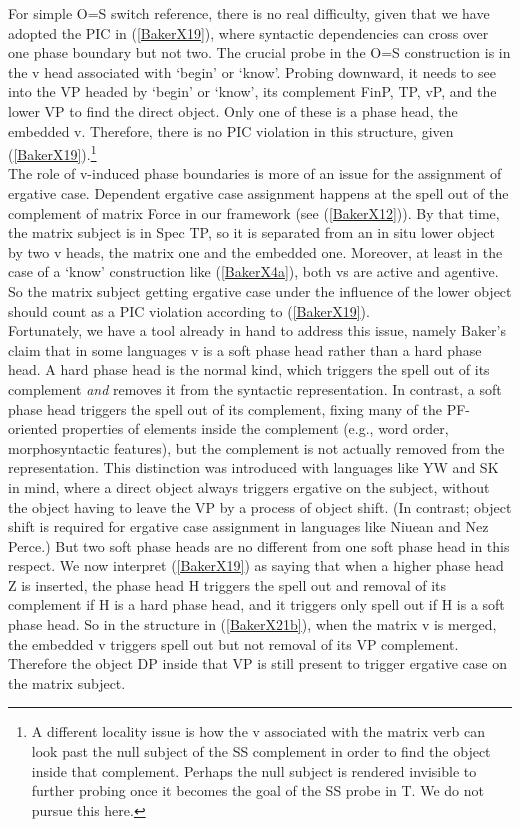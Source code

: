 \documentclass[output=paper,colorlinks,citecolor=brown,
]{langscibook}
\begin{document}
For simple O=S switch reference, there is no real difficulty, given that we have adopted the PIC in (\ref{BakerX19}), where syntactic dependencies can cross over one phase boundary but not two. The crucial probe in the O=S construction is in the v head associated with ‘begin’ or ‘know’. Probing downward, it needs to see into the VP headed by ‘begin’ or ‘know’, its complement FinP, TP, vP, and the lower VP to find the direct object. Only one of these is a phase head, the embedded v. Therefore, there is no PIC violation in this structure, given (\ref{BakerX19}).\footnote{A different locality issue is how the v associated with the matrix verb can look past the null subject of the SS complement in order to find the object inside that complement. Perhaps the null subject is rendered invisible to further probing once it becomes the goal of the SS probe in T. We do not pursue this here.}\\

The role of v-induced phase boundaries is more of an issue for the assignment of ergative case. Dependent ergative case assignment happens at the spell out of the complement of matrix Force in our framework (see (\ref{BakerX12})). By that time, the matrix subject is in Spec TP, so it is separated from an in situ lower object by two v heads, the matrix one and the embedded one. Moreover, at least in the case of a `know’ construction like (\ref{BakerX4a}), both vs are active and agentive. So the matrix subject getting ergative case under the influence of the lower object should count as a PIC violation according to (\ref{BakerX19}).\\

Fortunately, we have a tool already in hand to address this issue, namely Baker’s \citeyearpar{baker2015case} claim that in some languages v is a soft phase head rather than a hard phase head. A hard phase head is the normal kind, which triggers the spell out of its complement \textit{and} removes it from the syntactic representation. In contrast, a soft phase head triggers the spell out of its complement, fixing many of the PF-oriented properties of elements inside the complement (e.g., word order, morphosyntactic features), but the complement is not actually removed from the representation. This distinction was introduced with languages like YW and SK in mind, where a direct object always triggers ergative on the subject, without the object having to leave the VP by a process of object shift. (In contrast; object shift is required for ergative case assignment in languages like Niuean and Nez Perce.) But two soft phase heads are no different from one soft phase head in this respect. We now interpret (\ref{BakerX19}) as saying that when a higher phase head Z is inserted, the phase head H triggers the spell out and removal of its complement if H is a hard phase head, and it triggers only spell out if H is a soft phase head. So in the structure in (\ref{BakerX21b}), when the matrix v is merged, the embedded v triggers spell out but not removal of its VP complement. Therefore the object DP inside that VP is still present to trigger ergative case on the matrix subject.\\
\end{document}
